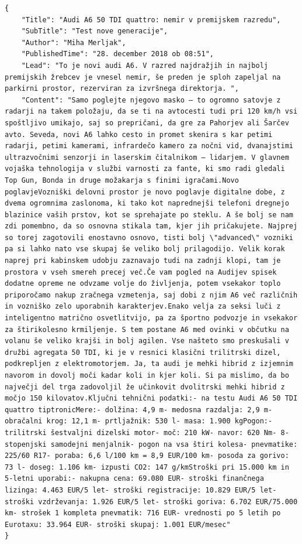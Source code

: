 \documentclass[runningheads]{llncs}
\begin{document}
\begin{lstlisting}[caption={Results for rtvslo website},captionpos=b, label={lst:label1}]
{
    "Title": "Audi A6 50 TDI quattro: nemir v premijskem razredu",
    "SubTitle": "Test nove generacije",
    "Author": "Miha Merljak",
    "PublishedTime": "28. december 2018 ob 08:51",
    "Lead": "To je novi audi A6. V razred najdražjih in najbolj premijskih žrebcev je vnesel nemir, še preden je sploh zapeljal na parkirni prostor, rezerviran za izvršnega direktorja. ",
    "Content": "Samo poglejte njegovo masko – to ogromno satovje z radarji na takem položaju, da se ti na avtocesti tudi pri 120 km/h vsi spoštljivo umikajo, saj so prepričani, da gre za Pahorjev ali Šarčev avto. Seveda, novi A6 lahko cesto in promet skenira s kar petimi radarji, petimi kamerami, infrardečo kamero za nočni vid, dvanajstimi ultrazvočnimi senzorji in laserskim čitalnikom – lidarjem. V glavnem vojaška tehnologija v službi varnosti za fante, ki smo radi gledali Top Gun, Bonda in druge možakarja s finimi igračami.Novo poglavjeVozniški delovni prostor je novo poglavje digitalne dobe, z dvema ogromnima zaslonoma, ki tako kot naprednejši telefoni dregnejo blazinice vaših prstov, kot se sprehajate po steklu. A še bolj se nam zdi pomembno, da so osnovna stikala tam, kjer jih pričakujete. Najprej so torej zagotovili enostavno osnovo, tisti bolj \"advanced\" vozniki pa si lahko nato vse skupaj še veliko bolj prilagodijo. Velik korak naprej pri kabinskem udobju zaznavajo tudi na zadnji klopi, tam je prostora v vseh smereh precej več.Če vam pogled na Audijev spisek dodatne opreme ne odvzame volje do življenja, potem vsekakor toplo priporočamo nakup zračnega vzmetenja, saj dobi z njim A6 več različnih in vozniško zelo uporabnih karakterjev.Enako velja za seksi luči z inteligentno matrično osvetlitvijo, pa za športno podvozje in vsekakor za štirikolesno krmiljenje. S tem postane A6 med ovinki v občutku na volanu še veliko krajši in bolj agilen. Vse našteto smo preskušali v družbi agregata 50 TDI, ki je v resnici klasični trilitrski dizel, podkrepljen z elektromotorjem. Ja, ta audi je mehki hibrid z izjemnim navorom in dovolj moči kadar koli in kjer koli. Si pa mislimo, da bo največji del trga zadovoljil že učinkovit dvolitrski mehki hibrid z močjo 150 kilovatov.Ključni tehnični podatki:- na testu Audi A6 50 TDI quattro tiptronicMere:- dolžina: 4,9 m- medosna razdalja: 2,9 m- obračalni krog: 12,1 m- prtljažnik: 530 l- masa: 1.900 kgPogon:- trilitrski šestvaljni dizelski motor- moč: 210 kW- navor: 620 Nm- 8-stopenjski samodejni menjalnik- pogon na vsa štiri kolesa- pnevmatike: 225/60 R17- poraba: 6,6 l/100 km = 8,9 EUR/100 km- posoda za gorivo: 73 l- doseg: 1.106 km- izpusti CO2: 147 g/kmStroški pri 15.000 km in 5-letni uporabi:- nakupna cena: 69.080 EUR- stroški finančnega lizinga: 4.463 EUR/5 let- stroški registracije: 10.829 EUR/5 let- stroški vzdrževanja: 1.926 EUR/5 let- stroški goriva: 6.702 EUR/75.000 km- strošek 1 kompleta pnevmatik: 716 EUR- vrednosti po 5 letih po Eurotaxu: 33.964 EUR- stroški skupaj: 1.001 EUR/mesec"
}


\end{lstlisting}
\end{document}
